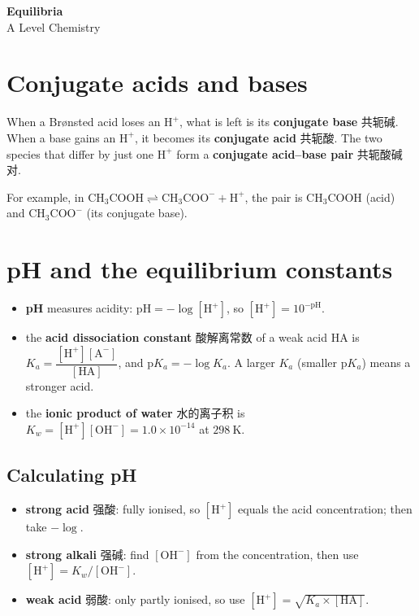\documentclass[11pt]{article}
\begin{document}
\begin{center}
  {\LARGE\bfseries Equilibria}\\[0.35em]
  {\large A Level Chemistry}
\end{center}
\vspace{0.6em}

\section*{Conjugate acids and bases}

When a Brønsted acid loses an $\text{H}^+$, what is left is its \textbf{conjugate base} 共轭碱. When a base gains an $\text{H}^+$, it becomes its \textbf{conjugate acid} 共轭酸. The two species that differ by just one $\text{H}^+$ form a \textbf{conjugate acid–base pair} 共轭酸碱对.

For example, in $\text{CH}_3\text{COOH} \rightleftharpoons \text{CH}_3\text{COO}^- + \text{H}^+$, the pair is $\text{CH}_3\text{COOH}$ (acid) and $\text{CH}_3\text{COO}^-$ (its conjugate base).

\section*{pH and the equilibrium constants}

\begin{itemize}
\item \textbf{pH} measures acidity: $\text{pH} = -\log[\text{H}^+]$, so $[\text{H}^+] = 10^{-\text{pH}}$.

\item the \textbf{acid dissociation constant} 酸解离常数 of a weak acid $\text{HA}$ is $K_a = \dfrac{[\text{H}^+][\text{A}^-]}{[\text{HA}]}$, and $\text{p}K_a = -\log K_a$. A larger $K_a$ (smaller $\text{p}K_a$) means a stronger acid.

\item the \textbf{ionic product of water} 水的离子积 is $K_w = [\text{H}^+][\text{OH}^-] = 1.0 \times 10^{-14}$ at $298\ \text{K}$.

\end{itemize}

\subsection*{Calculating pH}

\begin{itemize}
\item \textbf{strong acid} 强酸: fully ionised, so $[\text{H}^+]$ equals the acid concentration; then take $-\log$.

\item \textbf{strong alkali} 强碱: find $[\text{OH}^-]$ from the concentration, then use $[\text{H}^+] = K_w / [\text{OH}^-]$.

\item \textbf{weak acid} 弱酸: only partly ionised, so use $[\text{H}^+] = \sqrt{K_a \times [\text{HA}]}$.

\end{itemize}
\end{document}
